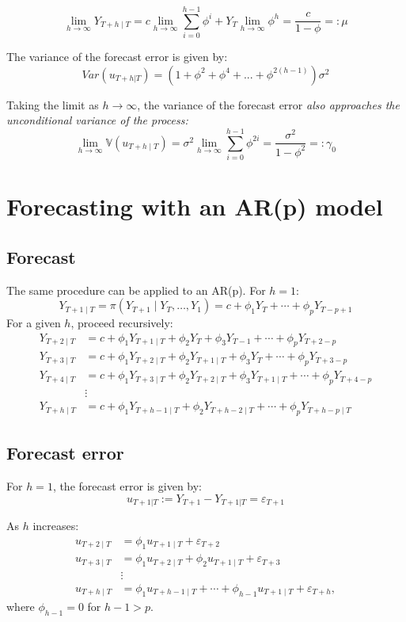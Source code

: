 \documentclass[11pt, a4paper]{report}
\theoremstyle{plain}
\theoremstyle{plain}
\theoremstyle{remark}
\begin{document}
$$\lim _{h \rightarrow \infty} Y_{T+h \mid T}=c \lim _{h \rightarrow \infty} \sum_{i=0}^{h-1} \phi^{i}+Y_{T} \lim _{h \rightarrow \infty} \phi^{h}=\frac{c}{1-\phi}=: \mu$$

The variance of the forecast error is given by:
$$ Var(u_{T+h|T}) = (1 + \phi^{2} + \phi^4 + ... + \phi^{2(h-1)})\sigma^2 $$

Taking the limit as $h \to \infty$, the variance of the forecast error \textit{also approaches the unconditional variance of the process:}
$$\lim _{h \rightarrow \infty} \mathbb{V}\left(u_{T+h \mid T}\right)=\sigma^{2} \lim _{h \rightarrow \infty} \sum_{i=0}^{h-1} \phi^{2 i}=\frac{\sigma^{2}}{1-\phi^{2}}=: \gamma_{0}$$

\section{Forecasting with an AR(p) model}

\subsection{Forecast}

The same procedure can be applied to an AR(p). For $h = 1$: 
$$
Y_{T+1 \mid T}=\pi\left(Y_{T+1} \mid Y_{T}, \ldots, Y_{1}\right)=c+\phi_{1} Y_{T}+\cdots+\phi_{p} Y_{T-p+1}
$$
For a given $h$, proceed recursively:
$$\begin{aligned}
	Y_{T+2 \mid T} &=c+\phi_{1} Y_{T+1 \mid T}+\phi_{2} Y_{T}+\phi_{3} Y_{T-1}+\cdots+\phi_{p} Y_{T+2-p} \\
	Y_{T+3 \mid T} &=c+\phi_{1} Y_{T+2 \mid T}+\phi_{2} Y_{T+1 \mid T}+\phi_{3} Y_{T}+\cdots+\phi_{p} Y_{T+3-p} \\
	Y_{T+4 \mid T} &=c+\phi_{1} Y_{T+3 \mid T}+\phi_{2} Y_{T+2 \mid T}+\phi_{3} Y_{T+1 \mid T}+\cdots+\phi_{p} Y_{T+4-p} \\
	& \vdots \\
	Y_{T+h \mid T} &=c+\phi_{1} Y_{T+h-1 \mid T}+\phi_{2} Y_{T+h-2 \mid T}+\cdots+\phi_{p} Y_{T+h-p \mid T}
\end{aligned}$$

\subsection{Forecast error}

For $h=1$, the forecast error is given by:
$$ u_{T+1|T} := Y_{T+1} - Y_{T+1|T} = \varepsilon_{T+1}$$

As $h$ increases:
$$\begin{aligned}
	u_{T+2 \mid T} &=\phi_{1} u_{T+1 \mid T}+\varepsilon_{T+2} \\
	u_{T+3 \mid T} &=\phi_{1} u_{T+2 \mid T}+\phi_{2} u_{T+1 \mid T}+\varepsilon_{T+3} \\
	& \vdots \\
	u_{T+h \mid T} &=\phi_{1} u_{T+h-1 \mid T}+\cdots+\phi_{h-1} u_{T+1 \mid T}+\varepsilon_{T+h},
\end{aligned}$$
where $\phi_{h-1} = 0$ for $h-1>p$.
\end{document}
